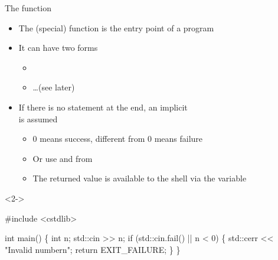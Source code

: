 \begin{frame}[fragile]{The  function}
  \begin{itemize}
  \item The  (special) function is the entry point of a program
  \item It can have two forms
    \begin{itemize}
    \item {}
    \item \ldots (see later)
    \end{itemize}
  \item<2-> If there is no  statement at the end, an implicit\\
     is assumed
    \begin{itemize}
    \item $0$ means success, different from $0$ means failure
    \item Or use  and  from 
    \item The returned value is available to the shell via the 
      variable
    \end{itemize}
  \end{itemize}

  \begin{codeblock}<2->{
#include <cstdlib>

int main() \{
  int n;
  std::cin >> n;
  if (std::cin.fail() || n < 0) \{
    std::cerr << "Invalid number\bslash{}n";
    return EXIT_FAILURE;
  \}
  \ddd
\}}\end{codeblock}

\end{frame}

